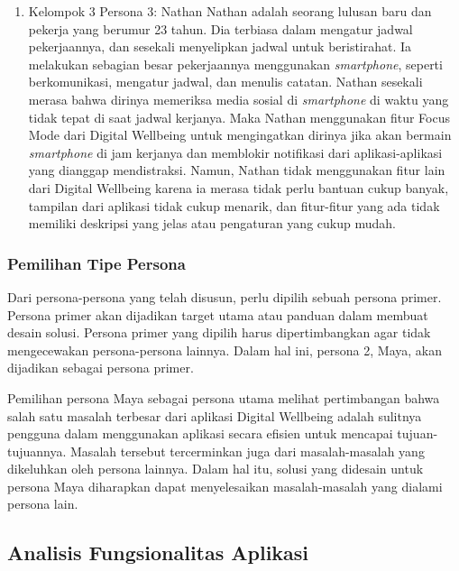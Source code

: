 \begin{enumerate}
  \item Kelompok 3 \textemdash \space Persona 3: Nathan
  \subitem Nathan adalah seorang lulusan baru dan pekerja yang berumur 23 tahun. Dia terbiasa dalam mengatur jadwal pekerjaannya, dan sesekali menyelipkan jadwal untuk beristirahat. Ia melakukan sebagian besar pekerjaannya menggunakan \textit{smartphone}, seperti berkomunikasi, mengatur jadwal, dan menulis catatan. Nathan sesekali merasa bahwa dirinya memeriksa media sosial di \textit{smartphone} di waktu yang tidak tepat di saat jadwal kerjanya. Maka Nathan menggunakan fitur Focus Mode dari Digital Wellbeing untuk mengingatkan dirinya jika akan bermain \textit{smartphone} di jam kerjanya dan memblokir notifikasi dari aplikasi-aplikasi yang dianggap mendistraksi. Namun, Nathan tidak menggunakan fitur lain dari Digital Wellbeing karena ia merasa tidak perlu bantuan cukup banyak, tampilan dari aplikasi tidak cukup menarik, dan fitur-fitur yang ada tidak memiliki deskripsi yang jelas atau pengaturan yang cukup mudah.

\end{enumerate}

\subsubsection{Pemilihan Tipe Persona}
Dari persona-persona yang telah disusun, perlu dipilih sebuah persona primer. Persona primer akan dijadikan target utama atau panduan dalam membuat desain solusi. Persona primer yang dipilih harus dipertimbangkan agar tidak mengecewakan persona-persona lainnya. Dalam hal ini, persona 2, Maya, akan dijadikan sebagai persona primer.

\newpage
Pemilihan persona Maya sebagai persona utama melihat pertimbangan bahwa salah satu masalah terbesar dari aplikasi Digital Wellbeing adalah sulitnya pengguna dalam menggunakan aplikasi secara efisien untuk mencapai tujuan-tujuannya. Masalah tersebut tercerminkan juga dari masalah-masalah yang dikeluhkan oleh persona lainnya. Dalam hal itu, solusi yang didesain untuk persona Maya diharapkan dapat menyelesaikan masalah-masalah yang dialami persona lain.



\subsection{Analisis Fungsionalitas Aplikasi}
\label{subsec:analisis_fungsionalitas}

